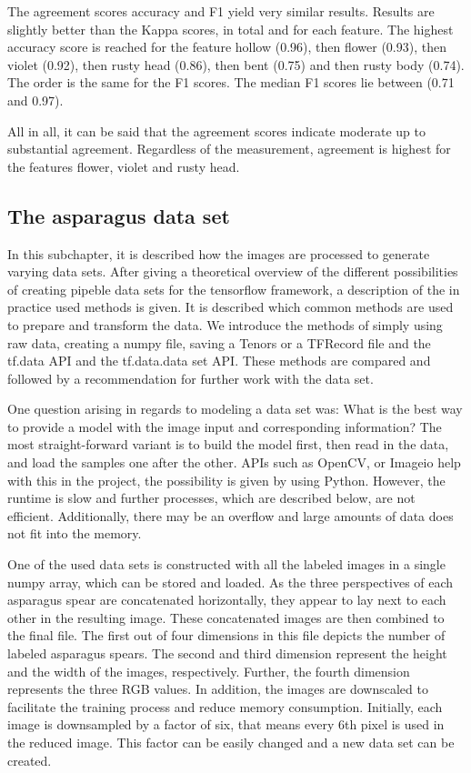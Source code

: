 \bigskip
The agreement scores accuracy and F1 yield very similar results. Results are slightly better than the Kappa scores, in total and for each feature. The highest accuracy score is reached for the feature hollow (0.96), then flower (0.93), then violet (0.92), then rusty head (0.86), then bent (0.75) and then rusty body (0.74). The order is the same for the F1 scores. The median F1 scores lie between (0.71 and 0.97).

\bigskip
All in all, it can be said that the agreement scores indicate moderate up to substantial agreement. Regardless of the measurement, agreement is highest for the features flower, violet and rusty head.


\subsection{The asparagus data set}
\label{sec:AsparagusDataSet}

In this subchapter, it is described how the images are processed to generate varying data sets. After giving a theoretical overview of the different possibilities of creating pipeble data sets for the tensorflow framework, a description of the in practice used methods is given. It is described which common methods are used to prepare and transform the data. We introduce the methods of simply using raw data, creating a numpy file, saving a Tenors or a TFRecord file and the tf.data API and the tf.data.data set API. These methods are compared and followed by a recommendation for further work with the data set.

One question arising in regards to modeling a data set was: What is the best way to provide a model with the image input and corresponding information? The most straight-forward variant is to build the model first, then read in the data, and load the samples one after the other. APIs such as OpenCV, or Imageio help with this in the project, the possibility is given by using Python. However, the runtime is slow and further processes, which are described below, are not efficient. Additionally, there may be an overflow and large amounts of data does not fit into the memory.

\bigskip
One of the used data sets is constructed with all the labeled images in a single numpy array, which can be stored and loaded. As the three perspectives of each asparagus spear are concatenated horizontally, they appear to lay next to each other in the resulting image. These concatenated images are then combined to the final file. The first out of four dimensions in this file depicts the number of labeled asparagus spears. The second and third dimension represent the height and the width of the images, respectively.  Further, the fourth dimension represents the three RGB values.
In addition, the images are downscaled to facilitate the training process and reduce memory consumption. Initially, each image is downsampled by a factor of six, that means every 6th pixel is used in the reduced image. This factor can be easily changed and a new data set can be created. 

